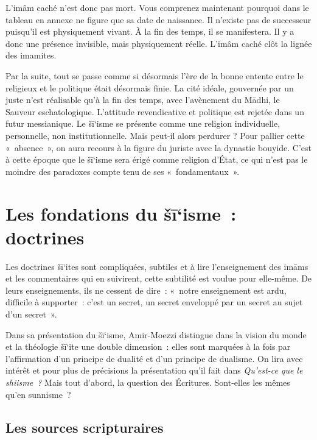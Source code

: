 L'imâm caché n'est donc pas mort. Vous comprenez maintenant pourquoi
dans le tableau en annexe ne figure que sa date de naissance. Il
n'existe pas de successeur puisqu'il est physiquement vivant. À la fin
des temps, il se manifestera. Il y a donc une présence invisible, mais
physiquement réelle. L'imâm caché clôt la lignée des imamites.

Par la suite, tout se passe comme si désormais l'ère de la bonne entente
entre le religieux et le politique était désormais finie. La cité
idéale, gouvernée par un juste n'est réalisable qu'à la fin des temps,
avec l'avènement du Mādhi, le Sauveur eschatologique. L'attitude
revendicative et politique est rejetée dans un futur messianique. Le
šī`isme se présente comme une religion individuelle, personnelle, non
institutionnelle. Mais peut-il alors perdurer ? Pour pallier cette
«~absence~», on aura recours à la figure du juriste avec la dynastie
bouyide. C'est à cette époque que le šī`isme sera érigé comme religion
d'État, ce qui n'est pas le moindre des paradoxes compte tenu de ses
«~fondamentaux~».

 
\section{Les fondations du šī`isme~:
doctrines}\label{ii.-les-fondations-du-ux161ux12bisme-doctrines}

Les doctrines šī`ites sont compliquées, subtiles et à lire
l'enseignement des imāms et les commentaires qui en suivirent, cette
subtilité est voulue pour elle-même. De leurs enseignements, ils ne
cessent de dire~: «~notre enseignement est ardu, difficile à supporter~:
c'est un secret, un secret enveloppé par un secret au sujet d'un
secret~».

Dans sa présentation du šī`isme, Amir-Moezzi distingue dans la vision du
monde et la théologie šī`ite une double dimension~: elles sont marquées
à la fois par l'affirmation d'un principe de dualité et d'un principe de
dualisme. On lira avec intérêt et pour plus de précisions la
présentation qu'il fait dans \emph{Qu'est-ce que le shiisme~?} Mais tout
d'abord, la question des Écritures. Sont-elles les mêmes qu'en
sunnisme~?

 
\subsection{{Les sources scripturaires
}}\label{les-sources-scripturaires}


